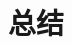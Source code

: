 \documentclass[lang=cn,11pt,a4paper,numbers]{elegantpaper}
\begin{document}
\section{总结}















\end{document}
